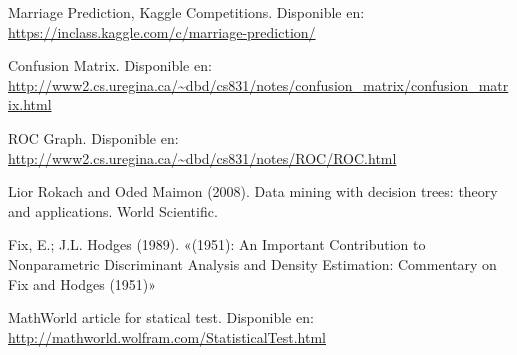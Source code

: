 \documentclass{sciposter}
\begin{document}
\begin{multicols}{3}

\begin{thebibliography}{1}

\newblock Marriage Prediction, Kaggle Competitions. Disponible en: \url{https://inclass.kaggle.com/c/marriage-prediction/}

\newblock Confusion Matrix. Disponible en: \url{http://www2.cs.uregina.ca/~dbd/cs831/notes/confusion_matrix/confusion_matrix.html}

\newblock ROC Graph. Disponible en: \url{http://www2.cs.uregina.ca/~dbd/cs831/notes/ROC/ROC.html}

\newblock Lior Rokach and Oded Maimon (2008). Data mining with decision trees: theory and applications. World Scientific.

\newblock  Fix, E.; J.L. Hodges (1989). «(1951): An Important Contribution to Nonparametric Discriminant Analysis and Density Estimation: Commentary on Fix and Hodges (1951)»

\newblock MathWorld article for statical test. Disponible en: \url{http://mathworld.wolfram.com/StatisticalTest.html}

    
\end{thebibliography}

\end{multicols}
\end{document}
